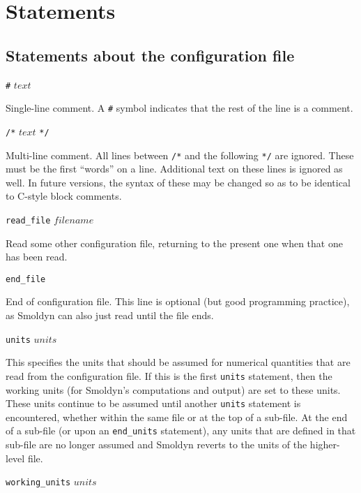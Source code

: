 \documentclass {scrbook}
\newcommand {\ttt} {\texttt}
\begin{document}
\chapter{Statements}

\section{Statements about the configuration file}

\begin{description}

\item{\ttt{\#} $text$}

Single-line comment. A \ttt{\#} symbol indicates that the rest of the line is a comment.

\item{\ttt{/*} $text$ \ttt{*/}}

Multi-line comment. All lines between \ttt{/*} and the following \ttt{*/} are ignored. These must be the first ``words'' on a line. Additional text on these lines is ignored as well. In future versions, the syntax of these may be changed so as to be identical to C-style block comments.

\item{\ttt{read\_file} $filename$}

Read some other configuration file, returning to the present one when that one has been read.

\item{\ttt{end\_file}}

End of configuration file. This line is optional (but good programming practice), as Smoldyn can also just read until the file ends.

\item{\ttt{units} $units$}

This specifies the units that should be assumed for numerical quantities that are read from the configuration file. If this is the first \ttt{units} statement, then the working units (for Smoldyn's computations and output) are set to these units. These units continue to be assumed until another \ttt{units} statement is encountered, whether within the same file or at the top of a sub-file. At the end of a sub-file (or upon an \ttt{end\_units} statement), any units that are defined in that sub-file are no longer assumed and Smoldyn reverts to the units of the higher-level file.

\item{\ttt{working\_units} $units$}


\end{description}
\end{document}
